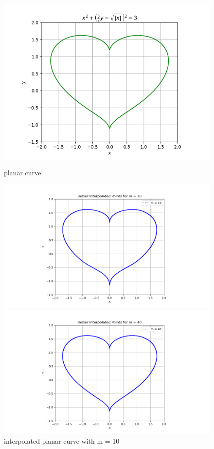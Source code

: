 \documentclass[a4paper]{article}
\begin{document}
\begin{figure}[ht]
  \centering
  \begin{minipage}[b]{0.45\textwidth}
    \centering
    \includegraphics[width=\textwidth]{figures/bezier0.png}
    \caption{planar curve}
    \label{fig:planar curve}
  \end{minipage}
  \hfill
  \begin{minipage}[b]{0.45\textwidth}
    \centering
    \includegraphics[width=\textwidth]{figures/bezier_update1.png}
    \caption{interpolated planar curve with m = 10}
    \label{fig:bezierm10}
  \end{minipage}
  \vfill
  \begin{minipage}[b]{0.45\textwidth}
    \centering
    \includegraphics[width=\textwidth]{figures/bezier_update2.png}

\end{minipage}
\end{figure}
\end{document}
